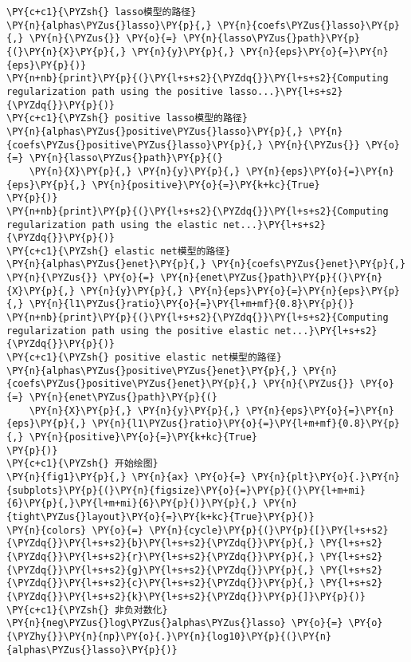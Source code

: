 \begin{Verbatim}[commandchars=\\\{\}]
\PY{c+c1}{\PYZsh{} lasso模型的路径}
\PY{n}{alphas\PYZus{}lasso}\PY{p}{,} \PY{n}{coefs\PYZus{}lasso}\PY{p}{,} \PY{n}{\PYZus{}} \PY{o}{=} \PY{n}{lasso\PYZus{}path}\PY{p}{(}\PY{n}{X}\PY{p}{,} \PY{n}{y}\PY{p}{,} \PY{n}{eps}\PY{o}{=}\PY{n}{eps}\PY{p}{)}
\PY{n+nb}{print}\PY{p}{(}\PY{l+s+s2}{\PYZdq{}}\PY{l+s+s2}{Computing regularization path using the positive lasso...}\PY{l+s+s2}{\PYZdq{}}\PY{p}{)}
\PY{c+c1}{\PYZsh{} positive lasso模型的路径}
\PY{n}{alphas\PYZus{}positive\PYZus{}lasso}\PY{p}{,} \PY{n}{coefs\PYZus{}positive\PYZus{}lasso}\PY{p}{,} \PY{n}{\PYZus{}} \PY{o}{=} \PY{n}{lasso\PYZus{}path}\PY{p}{(}
    \PY{n}{X}\PY{p}{,} \PY{n}{y}\PY{p}{,} \PY{n}{eps}\PY{o}{=}\PY{n}{eps}\PY{p}{,} \PY{n}{positive}\PY{o}{=}\PY{k+kc}{True}
\PY{p}{)}
\PY{n+nb}{print}\PY{p}{(}\PY{l+s+s2}{\PYZdq{}}\PY{l+s+s2}{Computing regularization path using the elastic net...}\PY{l+s+s2}{\PYZdq{}}\PY{p}{)}
\PY{c+c1}{\PYZsh{} elastic net模型的路径}
\PY{n}{alphas\PYZus{}enet}\PY{p}{,} \PY{n}{coefs\PYZus{}enet}\PY{p}{,} \PY{n}{\PYZus{}} \PY{o}{=} \PY{n}{enet\PYZus{}path}\PY{p}{(}\PY{n}{X}\PY{p}{,} \PY{n}{y}\PY{p}{,} \PY{n}{eps}\PY{o}{=}\PY{n}{eps}\PY{p}{,} \PY{n}{l1\PYZus{}ratio}\PY{o}{=}\PY{l+m+mf}{0.8}\PY{p}{)}
\PY{n+nb}{print}\PY{p}{(}\PY{l+s+s2}{\PYZdq{}}\PY{l+s+s2}{Computing regularization path using the positive elastic net...}\PY{l+s+s2}{\PYZdq{}}\PY{p}{)}
\PY{c+c1}{\PYZsh{} positive elastic net模型的路径}
\PY{n}{alphas\PYZus{}positive\PYZus{}enet}\PY{p}{,} \PY{n}{coefs\PYZus{}positive\PYZus{}enet}\PY{p}{,} \PY{n}{\PYZus{}} \PY{o}{=} \PY{n}{enet\PYZus{}path}\PY{p}{(}
    \PY{n}{X}\PY{p}{,} \PY{n}{y}\PY{p}{,} \PY{n}{eps}\PY{o}{=}\PY{n}{eps}\PY{p}{,} \PY{n}{l1\PYZus{}ratio}\PY{o}{=}\PY{l+m+mf}{0.8}\PY{p}{,} \PY{n}{positive}\PY{o}{=}\PY{k+kc}{True}
\PY{p}{)}
\PY{c+c1}{\PYZsh{} 开始绘图}
\PY{n}{fig1}\PY{p}{,} \PY{n}{ax} \PY{o}{=} \PY{n}{plt}\PY{o}{.}\PY{n}{subplots}\PY{p}{(}\PY{n}{figsize}\PY{o}{=}\PY{p}{(}\PY{l+m+mi}{6}\PY{p}{,}\PY{l+m+mi}{6}\PY{p}{)}\PY{p}{,} \PY{n}{tight\PYZus{}layout}\PY{o}{=}\PY{k+kc}{True}\PY{p}{)}
\PY{n}{colors} \PY{o}{=} \PY{n}{cycle}\PY{p}{(}\PY{p}{[}\PY{l+s+s2}{\PYZdq{}}\PY{l+s+s2}{b}\PY{l+s+s2}{\PYZdq{}}\PY{p}{,} \PY{l+s+s2}{\PYZdq{}}\PY{l+s+s2}{r}\PY{l+s+s2}{\PYZdq{}}\PY{p}{,} \PY{l+s+s2}{\PYZdq{}}\PY{l+s+s2}{g}\PY{l+s+s2}{\PYZdq{}}\PY{p}{,} \PY{l+s+s2}{\PYZdq{}}\PY{l+s+s2}{c}\PY{l+s+s2}{\PYZdq{}}\PY{p}{,} \PY{l+s+s2}{\PYZdq{}}\PY{l+s+s2}{k}\PY{l+s+s2}{\PYZdq{}}\PY{p}{]}\PY{p}{)}
\PY{c+c1}{\PYZsh{} 非负对数化}
\PY{n}{neg\PYZus{}log\PYZus{}alphas\PYZus{}lasso} \PY{o}{=} \PY{o}{\PYZhy{}}\PY{n}{np}\PY{o}{.}\PY{n}{log10}\PY{p}{(}\PY{n}{alphas\PYZus{}lasso}\PY{p}{)}

\end{Verbatim}
